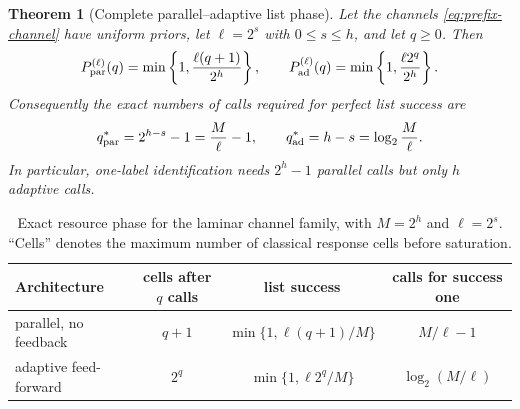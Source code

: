 \documentclass[11pt]{article}
\newtheorem{theorem}{Theorem}[section]
\theoremstyle{definition}
\theoremstyle{remark}
\begin{document}
\begin{theorem}[Complete parallel--adaptive list phase]
\label{thm:laminar-phase}
Let the channels \eqref{eq:prefix-channel} have uniform priors, let
$\ell=2^s$ with $0\leq s\leq h$, and let $q\geq0$.  Then
\begin{equation}\label{eq:architecture-phase}
 P_{\rm par}^{(\ell)}(q)=
 \min\left\{1,\frac{\ell(q+1)}{2^h}\right\},\qquad
 P_{\rm ad}^{(\ell)}(q)=
 \min\left\{1,\frac{\ell2^q}{2^h}\right\}.
\end{equation}
Consequently the exact numbers of calls required for perfect list success are
\begin{equation}\label{eq:query-thresholds}
 q_{\rm par}^*=2^{h-s}-1=\frac{M}{\ell}-1,\qquad
 q_{\rm ad}^*=h-s=\log_2\frac{M}{\ell}.
\end{equation}
In particular, one-label identification needs $2^h-1$ parallel calls but
only $h$ adaptive calls.
\end{theorem}

\begin{table}[ht]
\centering
\caption{Exact resource phase for the laminar channel family, with
$M=2^h$ and $\ell=2^s$.  ``Cells'' denotes the maximum number of classical
response cells before saturation.}
\label{tab:adaptive-phase}
\begin{tabular}{@{}lccc@{}}
\toprule
Architecture & cells after $q$ calls & list success & calls for success one\\
\midrule
parallel, no feedback & $q+1$ & $\min\{1,\ell(q+1)/M\}$ & $M/\ell-1$\\
adaptive feed-forward & $2^q$ & $\min\{1,\ell2^q/M\}$ & $\log_2(M/\ell)$\\
\bottomrule
\end{tabular}
\end{table}
\end{document}
